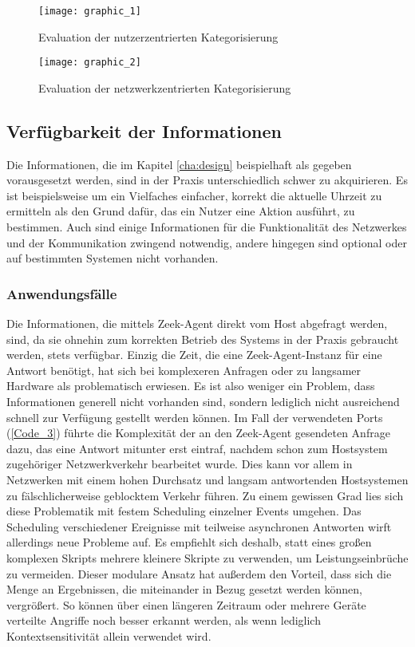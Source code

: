 \begin{figure}[H]
\texttt{[image: graphic\_1]}
\caption{Evaluation der nutzerzentrierten Kategorisierung}
\label{Tax_Ev_1}
\end{figure}

\begin{figure}
\texttt{[image: graphic\_2]}
\caption{Evaluation der netzwerkzentrierten Kategorisierung}
\label{Tax_Ev_2}
\end{figure}

\subsection{Verfügbarkeit der Informationen}
Die Informationen, die im Kapitel \ref{cha:design} beispielhaft als gegeben vorausgesetzt werden, sind in der Praxis unterschiedlich schwer zu akquirieren. Es ist beispielsweise um ein Vielfaches einfacher, korrekt die aktuelle Uhrzeit zu ermitteln als den Grund dafür, das ein Nutzer eine Aktion ausführt, zu bestimmen. Auch sind einige Informationen für die Funktionalität des Netzwerkes und der Kommunikation zwingend notwendig, andere hingegen sind optional oder auf bestimmten Systemen nicht vorhanden.
\subsubsection{Anwendungsfälle}
Die Informationen, die mittels Zeek-Agent direkt vom Host abgefragt werden, sind, da sie ohnehin zum korrekten Betrieb des Systems in der Praxis gebraucht werden, stets verfügbar. Einzig die Zeit, die eine Zeek-Agent-Instanz für eine Antwort benötigt, hat sich bei komplexeren Anfragen oder zu langsamer Hardware als problematisch erwiesen. Es ist also weniger ein Problem, dass Informationen generell nicht vorhanden sind, sondern lediglich nicht ausreichend schnell zur Verfügung gestellt werden können. Im Fall der verwendeten Ports (\ref{Code_3}) führte die Komplexität der an den Zeek-Agent gesendeten Anfrage dazu, das eine Antwort mitunter erst eintraf, nachdem schon zum Hostsystem zugehöriger Netzwerkverkehr bearbeitet wurde. Dies kann vor allem in Netzwerken mit einem hohen Durchsatz und langsam antwortenden Hostsystemen zu fälschlicherweise geblocktem Verkehr führen. Zu einem gewissen Grad lies sich diese Problematik mit festem Scheduling einzelner Events umgehen. Das Scheduling verschiedener Ereignisse mit teilweise asynchronen Antworten wirft allerdings neue Probleme auf. Es empfiehlt sich deshalb, statt eines großen komplexen Skripts mehrere kleinere Skripte zu verwenden, um Leistungseinbrüche zu vermeiden. Dieser modulare Ansatz hat außerdem den Vorteil, dass sich die Menge an Ergebnissen, die miteinander in Bezug gesetzt werden können, vergrößert. So können über einen längeren Zeitraum oder mehrere Geräte verteilte Angriffe noch besser erkannt werden, als wenn lediglich Kontextsensitivität allein verwendet wird.
